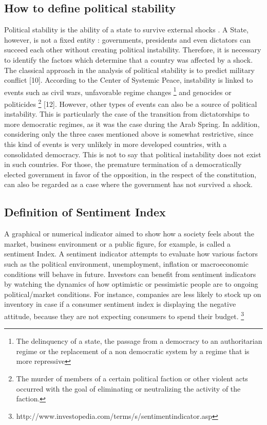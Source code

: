 \documentclass[12pt,a4paper]{article}
\begin{document}
\subsection{How to define political stability}
Political stability is the ability of a state to survive external shocks \cite{polit_stab}. A State, however, is not a fixed entity : governments, presidents and even dictators can succeed each other without creating political instability. Therefore, it is necessary to identify the factors which determine that a country was affected by a shock. The classical approach in the analysis of political stability is to predict military conflict [10]. According to the Center of Systemic Peace, instability is linked to events such as civil wars, unfavorable regime changes \footnote{The delinquency of a state, the passage from a democracy to an authoritarian regime or the replacement of a non democratic system by a regime that is more repressive} and genocides or politicides \footnote{The murder of members of a certain political faction or other violent acts occurred with the goal of eliminating or neutralizing the activity of the faction.} [12]. However, other types of events can also be a source of political instability. This is particularly the case of the transition from dictatorships to more democratic regimes, as it was the case during the Arab Spring. In addition, considering only the three cases mentioned above is somewhat restrictive, since this kind of events is very unlikely in more developed countries, with a consolidated democracy. This is not to say that political instability does not exist in such countries. For those, the premature termination of a democratically elected government in favor of the opposition, in the respect of the constitution, can also be regarded as a case where the government has not survived a shock.

\subsection{Definition of Sentiment Index}
A graphical or numerical indicator aimed to show how a society feels about the market, business environment or a public figure, for example, is called a sentiment Index. A sentiment indicator attempts to evaluate how various factors such as the political environment, unemployment, inflation or macroeconomic conditions will behave in future. Investors can benefit from sentiment indicators by watching the dynamics of how optimistic or pessimistic people are to ongoing political/market conditions. For instance, companies are less likely to stock up on inventory in case if a consumer sentiment index is displaying the negative attitude, because they are not expecting consumers to spend their budget. \footnote{http://www.investopedia.com/terms/s/sentimentindicator.asp}
\end{document}
